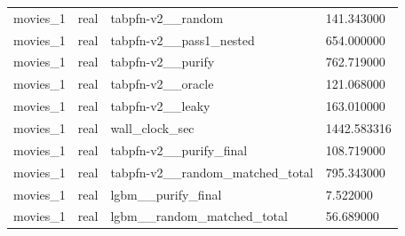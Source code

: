 \begin{tabular}{llll}
movies\_1 & real & tabpfn-v2\_\_random & 141.343000 \\
movies\_1 & real & tabpfn-v2\_\_pass1\_nested & 654.000000 \\
movies\_1 & real & tabpfn-v2\_\_purify & 762.719000 \\
movies\_1 & real & tabpfn-v2\_\_oracle & 121.068000 \\
movies\_1 & real & tabpfn-v2\_\_leaky & 163.010000 \\
movies\_1 & real & wall\_clock\_sec & 1442.583316 \\
movies\_1 & real & tabpfn-v2\_\_purify\_final & 108.719000 \\
movies\_1 & real & tabpfn-v2\_\_random\_matched\_total & 795.343000 \\
movies\_1 & real & lgbm\_\_purify\_final & 7.522000 \\
movies\_1 & real & lgbm\_\_random\_matched\_total & 56.689000 \\
\hline
\end{tabular}
